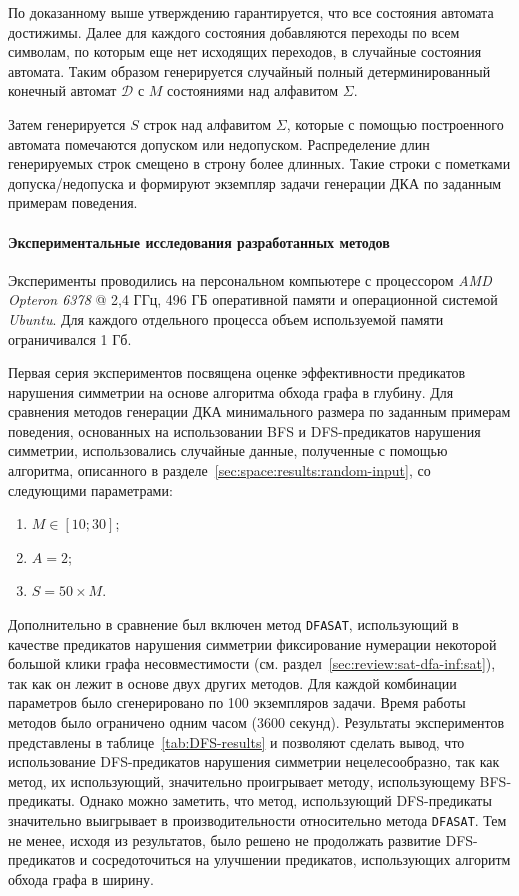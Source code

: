 По доказанному выше утверждению гарантируется, что все состояния автомата достижимы.
Далее для каждого состояния добавляются переходы по всем символам, по которым еще нет исходящих переходов, в случайные состояния автомата.
Таким образом генерируется случайный полный детерминированный конечный автомат $\mathcal{D}$ с $M$ состояниями над алфавитом $\Sigma$. 

Затем генерируется $S$ строк над алфавитом $\Sigma$, которые с помощью построенного автомата помечаются допуском или недопуском.
Распределение длин генерируемых строк смещено в строну более длинных.
Такие строки с пометками допуска/недопуска и формируют экземпляр задачи генерации ДКА по заданным примерам поведения.


\paragraph*{Экспериментальные исследования разработанных методов}
\label{sec:space:results:results}

Эксперименты проводились на персональном компьютере с процессором \emph{AMD Opteron 6378} @ 2,4 ГГц, 496 ГБ оперативной памяти и операционной системой \emph{Ubuntu}.
Для каждого отдельного процесса объем используемой памяти ограничивался 1 Гб.

Первая серия экспериментов посвящена оценке эффективности предикатов нарушения симметрии на основе алгоритма обхода графа в глубину.
Для сравнения методов генерации ДКА минимального размера по заданным примерам поведения, основанных на использовании BFS и DFS-предикатов нарушения симметрии, использовались случайные данные, полученные с помощью алгоритма, описанного в разделе~\ref{sec:space:results:random-input}, со следующими параметрами:
\begin{enumerate}
  \item $M \in \left[10;30\right]$;
  \item $A = 2$;
  \item $S = 50 \times M$.
\end{enumerate}

Дополнительно в сравнение был включен метод \texttt{DFASAT}, использующий в качестве предикатов нарушения симметрии фиксирование нумерации некоторой большой клики графа несовместимости (см. раздел~\ref{sec:review:sat-dfa-inf:sat}), так как он лежит в основе двух других методов.
Для каждой комбинации параметров было сгенерировано по 100 экземпляров задачи.
Время работы методов было ограничено одним часом (3600 секунд).
Результаты экспериментов представлены в таблице~\ref{tab:DFS-results} и позволяют сделать вывод, что использование DFS-предикатов нарушения симметрии нецелесообразно, так как метод, их использующий, значительно проигрывает методу, использующему BFS-предикаты.
Однако можно заметить, что метод, использующий DFS-предикаты значительно выигрывает в производительности относительно метода \texttt{DFASAT}.
Тем не менее, исходя из результатов, было решено не продолжать развитие DFS-предикатов и сосредоточиться на улучшении предикатов, использующих алгоритм обхода графа в ширину.

